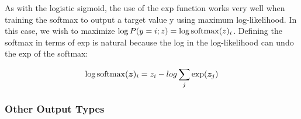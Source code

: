 \begin{multicols}{2}
	As with the logistic sigmoid, the use of the exp function works very well when training the softmax to output a target value y using maximum log-likelihood. In this case, we wish to maximize $\log P(y = i; z) = \log \mathrm{softmax}(z)_i$. Defining the softmax in terms of exp is natural because the log in the log-likelihood can undo the exp of the softmax:

	\[ \log \mathrm{softmax}({\bm{z}})_{i} = z_{i} - log\sum_{j}\exp({\bm{z}}_{j}) \]


	\subsubsection{Other Output Types}
	\newpage
\end{multicols}
